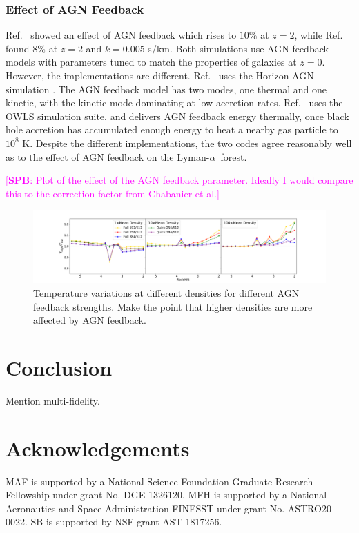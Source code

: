 \documentclass[a4paper,11pt]{article}
\newcommand{\spb}[1]{{\textcolor{magenta}{[{\bf SPB}: #1]}}}
\newcommand{\Lya}{Lyman-$\alpha$}
\begin{document}
\subsubsection{Effect of AGN Feedback}

Ref.~\cite{Viel:2013} showed an effect of AGN feedback which rises to $10\%$ at $z=2$, while Ref.~\cite{Chabanier:2020} found $8\%$ at $z=2$ and $k = 0.005$ s/km. Both simulations use AGN feedback models with parameters tuned to match the properties of galaxies at $z=0$. However, the implementations are different. Ref.~\cite{Chabanier:2020} uses the Horizon-AGN simulation \cite{Dubois:2016}. The AGN feedback model has two modes, one thermal and one kinetic, with the kinetic mode dominating at low accretion rates. Ref.~\cite{Viel:2013} uses the OWLS simulation suite, and delivers AGN feedback energy thermally, once black hole accretion has accumulated enough energy to heat a nearby gas particle to $10^8$ K. Despite the different implementations, the two codes agree reasonably well as to the effect of AGN feedback on the \Lya~forest.

\spb{Plot of the effect of the AGN feedback parameter. Ideally I would compare this to the correction factor from Chabanier et al.}

\begin{figure}
\includegraphics[width=1.\textwidth]{figures/comp-temps_fq.pdf}
 \caption{Temperature variations at different densities for different AGN feedback strengths. Make the point that higher densities are more affected by AGN feedback.}
 \label{fig:AGNtemp}
\end{figure}

\section{Conclusion}

Mention multi-fidelity.

\section*{Acknowledgements}
MAF is supported by a National Science Foundation Graduate Research Fellowship under grant No. DGE-1326120.
MFH is supported by a National Aeronautics and Space Administration FINESST under grant No. ASTRO20-0022.
SB is supported by NSF grant AST-1817256.
\end{document}
